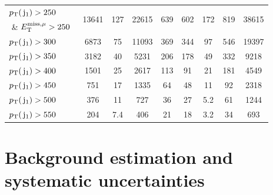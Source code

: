 \begin{table}[htb]
\begin{center}
{\begin{lrbox}{\cutflowBoxa}
\begin{tabular}{l|ccccccc|c}
$p_{\text{T}}(\,\mathrm{j}_1)>250$~\GeV{} 
& \multirow{2}{*}{13641}
& \multirow{2}{*}{127}   
& \multirow{2}{*}{22615}
& \multirow{2}{*}{639}
& \multirow{2}{*}{602}
& \multirow{2}{*}{172}
& \multirow{2}{*}{819}
& \multirow{2}{*}{38615}    \\
               \,\,\& $E^{\rm miss, \mu}_{\rm T}>250$~\GeV{}   &        &           &          &         &         &        &           &           \\
$p_{\text{T}}(\,\mathrm{j}_1)>300$~\GeV{}   &6873    &  75       &11093     & 369     & 344     & 97     &  546      &  19397   \\ 
$p_{\text{T}}(\,\mathrm{j}_1)>350$~\GeV{}   &3182    &  40       &5231      & 206     & 178     & 49     &  332      &  9218    \\ 
$p_{\text{T}}(\,\mathrm{j}_1)>400$~\GeV{}   &1501    &  25       &2617      & 113     & 91      & 21     &  181      &  4549    \\ 
$p_{\text{T}}(\,\mathrm{j}_1)>450$~\GeV{}   &751     &  17       &1335      & 64      & 48      & 11     &  92       &  2318    \\ 
$p_{\text{T}}(\,\mathrm{j}_1)>500$~\GeV{}   &376     &  11       &727       & 36      & 27      & 5.2    &  61       &  1244    \\ 
$p_{\text{T}}(\,\mathrm{j}_1)>550$~\GeV{}   &204     &  7.4      &406       & 21      & 18      & 3.2    &  34       &  693     \\ \hline 
\end{tabular}
\end{lrbox}
\scalebox{0.80}{\usebox{\cutflowBoxa}}} 
\end{center}
\end{table}



\section{Background estimation and systematic uncertainties}
\label{sec:BKG}


